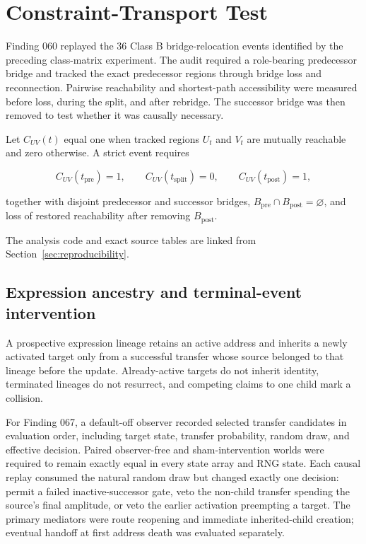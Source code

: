 \section{Constraint-Transport Test}
\label{sec:methods}

Finding 060 replayed the 36 Class B bridge-relocation events identified by the
preceding class-matrix experiment. The audit required a role-bearing predecessor
bridge and tracked the exact predecessor regions through bridge loss and
reconnection. Pairwise reachability and shortest-path accessibility were
measured before loss, during the split, and after rebridge. The successor bridge
was then removed to test whether it was causally necessary.

Let $C_{UV}(t)$ equal one when tracked regions $U_t$ and $V_t$ are mutually
reachable and zero otherwise. A strict event requires

\begin{equation}
C_{UV}(t_{\mathrm{pre}})=1,\qquad
C_{UV}(t_{\mathrm{split}})=0,\qquad
C_{UV}(t_{\mathrm{post}})=1,
\end{equation}

together with disjoint predecessor and successor bridges,
$B_{\mathrm{pre}}\cap B_{\mathrm{post}}=\varnothing$, and loss of restored
reachability after removing $B_{\mathrm{post}}$.

The analysis code and exact source tables are linked from
Section~\ref{sec:reproducibility}.

\subsection{Expression ancestry and terminal-event intervention}

A prospective expression lineage retains an active address and inherits a newly
activated target only from a successful transfer whose source belonged to that
lineage before the update. Already-active targets do not inherit identity,
terminated lineages do not resurrect, and competing claims to one child mark a
collision.

For Finding 067, a default-off observer recorded selected transfer candidates in
evaluation order, including target state, transfer probability, random draw,
and effective decision. Paired observer-free and sham-intervention worlds were
required to remain exactly equal in every state array and RNG state. Each causal
replay consumed the natural random draw but changed exactly one decision:
permit a failed inactive-successor gate, veto the non-child transfer spending
the source's final amplitude, or veto the earlier activation preempting a target.
The primary mediators were route reopening and immediate inherited-child
creation; eventual handoff at first address death was evaluated separately.

